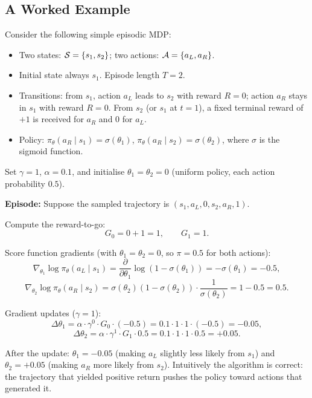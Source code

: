 \subsection{A Worked Example}

\begin{example}
\label{ex:reinforce-two-state}

Consider the following simple episodic MDP:
\begin{itemize}[leftmargin=*]
\item Two states: $\mathcal{S} = \{s_1, s_2\}$; two actions: $\mathcal{A} = \{a_L, a_R\}$.
\item Initial state always $s_1$.  Episode length $T = 2$.
\item Transitions: from $s_1$, action $a_L$ leads to $s_2$ with reward $R=0$; action $a_R$ stays in $s_1$ with reward $R=0$.  From $s_2$ (or $s_1$ at $t=1$), a fixed terminal reward of $+1$ is received for $a_R$ and $0$ for $a_L$.
\item Policy: $\pi_\theta(a_R \mid s_1) = \sigma(\theta_1)$, $\pi_\theta(a_R \mid s_2) = \sigma(\theta_2)$, where $\sigma$ is the sigmoid function.
\end{itemize}

Set $\gamma = 1$, $\alpha = 0.1$, and initialise $\theta_1 = \theta_2 = 0$ (uniform policy, each action probability $0.5$).

\medskip
\noindent\textbf{Episode:}  Suppose the sampled trajectory is $(s_1, a_L, 0, s_2, a_R, 1)$.

\medskip
Compute the reward-to-go:
\[
G_0 = 0 + 1 = 1, \qquad G_1 = 1.
\]

Score function gradients (with $\theta_1 = \theta_2 = 0$, so $\pi = 0.5$ for both actions):
\[
\nabla_{\theta_1} \log \pi_\theta(a_L \mid s_1)
= \frac{\partial}{\partial \theta_1} \log(1 - \sigma(\theta_1))
= -\sigma(\theta_1) = -0.5,
\]
\[
\nabla_{\theta_2} \log \pi_\theta(a_R \mid s_2)
= \sigma(\theta_2)(1 - \sigma(\theta_2)) \cdot \frac{1}{\sigma(\theta_2)} = 1 - 0.5 = 0.5.
\]

Gradient updates ($\gamma = 1$):
\[
\Delta \theta_1 = \alpha \cdot \gamma^0 \cdot G_0 \cdot (-0.5) = 0.1 \cdot 1 \cdot 1 \cdot (-0.5) = -0.05,
\]
\[
\Delta \theta_2 = \alpha \cdot \gamma^1 \cdot G_1 \cdot 0.5 = 0.1 \cdot 1 \cdot 1 \cdot 0.5 = +0.05.
\]

After the update: $\theta_1 = -0.05$ (making $a_L$ slightly less likely from $s_1$) and $\theta_2 = +0.05$ (making $a_R$ more likely from $s_2$).  Intuitively the algorithm is correct: the trajectory that yielded positive return pushes the policy toward actions that generated it.
\end{example}

